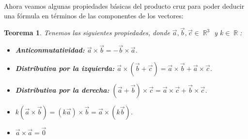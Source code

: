 \documentclass[12pt, fleqn]{report}                             %
\newtheorem{Theorem}{Teorema}[section]                          %
\newcommand{\Wrap}[1]{\left( #1 \right)}                        %
\DeclareMathOperator \Reals        {\mathbb{R}}                 %
\begin{document}
            	Ahora veamos algunas propiedades básicas del producto cruz para poder deducir una fórmula en términos de las componentes de los vectores:
            	
            	
            	\begin{Theorem}
            		Tenemos las siguientes propiedades, donde $\vec{a}, \vec{b}, \vec{c} \in \Reals^3$ y $k \in \Reals$:
            		\begin{itemize}\setlength\itemsep{0em}
            			\item \textbf{Anticonmutatividad:} $\vec{a} \times \vec{b} = -\vec{b} \times \vec{a}$.
            			
            			\item \textbf{Distributiva por la izquierda:} $\vec{a} \times \Wrap{\vec{b}+\vec{c}} = \vec{a} \times \vec{b} + \vec{a} \times \vec{c}$.
            			
            			\item \textbf{Distributiva por la derecha:} $\Wrap{\vec{a}+\vec{b}} \times \vec{c} = \vec{a} \times \vec{c} + \vec{b} \times \vec{c}$.
            			
            			\item $k\Wrap{\vec{a} \times \vec{b}} = \Wrap{k \vec{a}} \times \vec{b} = \vec{a} \times \Wrap{k \vec{b}}$.
            			
            			\item $\vec{a} \times \vec{a} = \vec{0}$
            		\end{itemize}
            	\end{Theorem}
            
            
\end{document}

